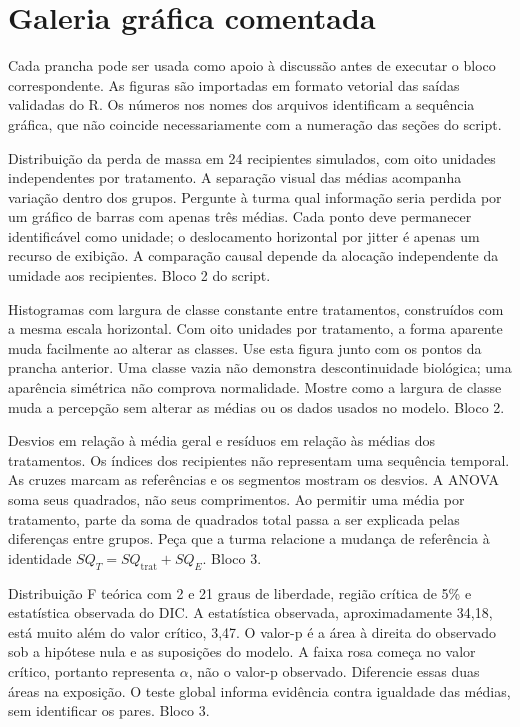 \chapter{Galeria gráfica comentada}
Cada prancha pode ser usada como apoio à discussão antes de executar o bloco correspondente. As figuras são importadas em formato vetorial das saídas validadas do R. Os números nos nomes dos arquivos identificam a sequência gráfica, que não coincide necessariamente com a numeração das seções do script.

{Distribuição da perda de massa em 24 recipientes simulados, com oito unidades independentes por tratamento.}
{A separação visual das médias acompanha variação dentro dos grupos. Pergunte à turma qual informação seria perdida por um gráfico de barras com apenas três médias. Cada ponto deve permanecer identificável como unidade; o deslocamento horizontal por jitter é apenas um recurso de exibição. A comparação causal depende da alocação independente da umidade aos recipientes. Bloco 2 do script.}

{Histogramas com largura de classe constante entre tratamentos, construídos com a mesma escala horizontal.}
{Com oito unidades por tratamento, a forma aparente muda facilmente ao alterar as classes. Use esta figura junto com os pontos da prancha anterior. Uma classe vazia não demonstra descontinuidade biológica; uma aparência simétrica não comprova normalidade. Mostre como a largura de classe muda a percepção sem alterar as médias ou os dados usados no modelo. Bloco 2.}

{Desvios em relação à média geral e resíduos em relação às médias dos tratamentos. Os índices dos recipientes não representam uma sequência temporal.}
{As cruzes marcam as referências e os segmentos mostram os desvios. A ANOVA soma seus quadrados, não seus comprimentos. Ao permitir uma média por tratamento, parte da soma de quadrados total passa a ser explicada pelas diferenças entre grupos. Peça que a turma relacione a mudança de referência à identidade $SQ_T=SQ_{\mathrm{trat}}+SQ_E$. Bloco 3.}

{Distribuição F teórica com 2 e 21 graus de liberdade, região crítica de 5\% e estatística observada do DIC.}
{A estatística observada, aproximadamente 34,18, está muito além do valor crítico, 3,47. O valor-p é a área à direita do observado sob a hipótese nula e as suposições do modelo. A faixa rosa começa no valor crítico, portanto representa $\alpha$, não o valor-p observado. Diferencie essas duas áreas na exposição. O teste global informa evidência contra igualdade das médias, sem identificar os pares. Bloco 3.}

